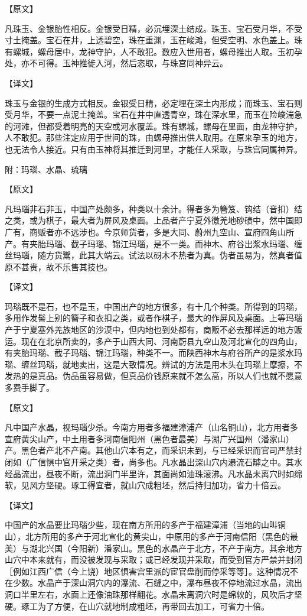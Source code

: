 \documentclass[12pt,UTF8]{ctexbook}
\begin{document}
【原文】

凡珠玉、金银胎性相反。金银受日精，必沉埋深土结成。珠玉、宝石受月华，不受寸土掩盖。宝石在井，上透碧空，珠在重渊，玉在峻滩，但受空明、水色盖上。珠有螺城，螺母居中，龙神守护，人不敢犯。数应入世用者，螺母推出人取。玉初孕处，亦不可得。玉神推徙入河，然后恣取，与珠宫同神异云。

【译文】

珠玉与金银的生成方式相反。金银受日精，必定埋在深土内形成；而珠玉、宝石则受月华，不要一点泥土掩盖。宝石在井中直透青空，珠在深水里，而玉在险峻湍急的河滩，但都受着明亮的天空或河水覆盖。珠有螺城，螺母在里面，由龙神守护，人不敢犯。那些注定应用于世间的珠，由螺母推出供人取用。在原来孕玉的地方，也无法令人接近。只有由玉神将其推迁到河里，才能任人采取，与珠宫同属神异。

附：玛瑙、水晶、琉璃

【原文】

凡玛瑙非石非玉，中国产处颇多，种类以十余计。得者多为簪笈、钩结（音扣）结之类，或为棋子，最大者为屏风及桌面。上品者产宁夏外徼羌地砂碛中，然中国即广有，商贩者亦不远涉也。今京师货者，多是大同、蔚州九空山、宣府四角山所产。有夹胎玛瑙、截子玛瑙、锦江玛瑙，是不一类。而神木、府谷出浆水玛瑙、缠丝玛瑙，随方货鬻，此其大端云。试法以砑木不热者为真。伪者虽易为，然真者值原不甚贵，故不乐售其技也。

【译文】

玛瑙既不是石，也不是玉，中国出产的地方很多，有十几个种类。所得到的玛瑙，多用作发髻上别的簪子和衣扣之类，或者作棋子，最大的作屏风及桌面。上等玛瑙产于宁夏塞外羌族地区的沙漠中，但内地也到处都有，商贩不必去那样远的地方贩运。现在在北京所卖的，多产于山西大同、河南蔚县九空山及河北宣化的四角山，有夹胎玛瑙、截子玛瑙、锦江玛瑙，种类不一。而陕西神木与府谷所产的是浆水玛瑙、缠丝玛瑙，就地卖出，这是大致情况。辨试的方法是用木头在玛瑙上摩擦，不发热的是真品。伪品虽容易做，但真品价钱原来就不怎么高，所以人们也就不愿意多费手脚了。

【原文】

凡中国产水晶，视玛瑙少杀。今南方用者多福建漳浦产（山名铜山），北方用者多宣府黄尖山产，中土用者多河南信阳州（黑色者最美）与湖广兴国州（潘家山）产。黑色者产北不产南。其他山穴本有之，而采识未到，与已经采识而官司严禁封闭如（广信惧中官开采之类）者，尚多也。凡水晶出深山穴内瀑流石罅之中。其水经晶流出，昼夜不断，流出洞门半里许，其面尚如油珠滚沸。凡水晶未离穴时如绵软，见风方坚硬。琢工得宜者，就山穴成粗坯，然后持归加功，省力十倍云。

【译文】

中国产的水晶要比玛瑙少些，现在南方所用的多产于福建漳浦（当地的山叫铜山），北方所用的多产于河北宣化的黄尖山，中原用的多产于河南信阳（黑色的最美）与湖北兴国（今阳新）潘家山。黑色的水晶产于北方，不产于南方。其余地方山穴中本来就有，而没被发现与采取；或已经发现并采取，而受到官方严禁并封闭［例如江西广信（今上饶）地区惧害宫里派的宦官盘削而停采等等］。这种情况不在少数。水晶产于深山洞穴内的瀑流、石缝之中，瀑布昼夜不停地流过水晶，流出洞口半里左右，水面上还像油珠那样翻花。水晶未离洞穴时是绵软的，风吹后才坚硬。琢工为了方便，在山穴就地制成粗坯，再带回去加工，可省力十倍。
\end{document}
